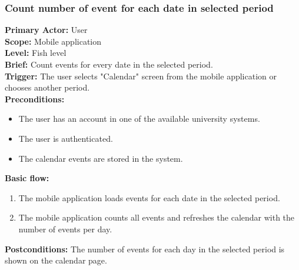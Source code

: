 \subsubsection{\large{Count number of event for each date in selected period}}
\textbf{Primary Actor:} User\\
\textbf{Scope:} Mobile application\\
\textbf{Level:} Fish level\\
\textbf{Brief:} Count events for every date in the selected period.\\
\textbf{Trigger:} The user selects "Calendar" screen from the mobile application or chooses another period.\\
\textbf{Preconditions:}
\begin{itemize}
    \item The user has an account in one of the available university systems.
    \item The user is authenticated.
    \item The calendar events are stored in the system.
\end{itemize}
\textbf{Basic flow:}
\begin{enumerate}
    \item The mobile application loads events for each date in the selected period.
    \item The mobile application counts all events and refreshes the calendar with the number of events per day.
\end{enumerate}
\textbf{Postconditions:}
The number of events for each day in the selected period is shown on the calendar page.


